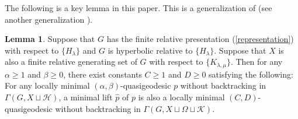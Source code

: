 \documentclass{amsart}
\theoremstyle{definition}
\newtheorem{Lem}[Thm]{Lemma}
\begin{document}
The following is a key lemma in this paper. 
This is a generalization of \cite[Lemma 4.4]{MP08} (see another generalization \cite[Proposition 3.9]{Yan11}). 
 
\begin{Lem}\label{minimallift}
Suppose that $G$ has the finite relative presentation (\ref{representation}) with respect to $\{H_\lambda\}$ and $G$ is hyperbolic relative to $\{H_\lambda\}$. 
Suppose that $X$ is also a finite relative generating set of $G$ with respect to $\{K_{\lambda,\mu}\}$. 
Then for any $\alpha\ge 1$ and $\beta\ge 0$, there exist constants $C\ge 1$ and $D\ge 0$ satisfying the following: 
For any locally minimal $(\alpha,\beta)$-quasigeodesic $p$ without backtracking in $\Gamma(G, X\sqcup {\mathcal H})$, a minimal lift $\widehat{p}$ of $p$ is also a locally minimal $(C,D)$-quasigeodesic without backtracking in $\Gamma(G, X\sqcup \Omega\sqcup{\mathcal K})$. 
\end{Lem}
\end{document}
